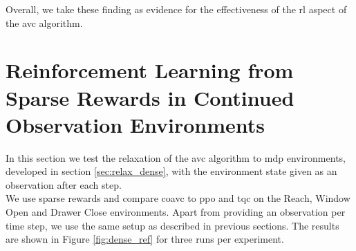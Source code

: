 Overall, we take these finding as evidence for the effectiveness of the \ac{rl} aspect of the \ac{avc} algorithm.


\section{Reinforcement Learning from Sparse Rewards in Continued Observation Environments}
\label{sec_exp_con_obs}
In this section we test the relaxation of the \ac{avc} algorithm to \ac{mdp} environments, developed in section \ref{sec:relax_dense}, with the environment state given as an observation after each step. \\
We use sparse rewards 
and compare \ac{coavc} to \ac{ppo} and \ac{tqc} on the Reach, Window Open and Drawer Close environments. Apart from 
providing an observation per time step,
we use the same setup as described in previous sections. The results are shown in Figure \ref{fig:dense_ref} for three runs per experiment.\\ 

